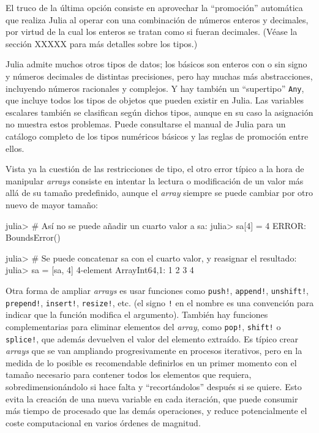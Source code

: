 ﻿\documentclass{article}
\newcommand{\code}{\texttt}
\begin{document}
El truco de la última opción consiste en aprovechar la ``promoción'' automática que realiza Julia al operar con una combinación de números enteros y decimales, por virtud de la cual los enteros se tratan como si fueran decimales. (Véase la sección XXXXX para más detalles sobre los tipos.)

Julia admite muchos otros tipos de datos; los básicos son enteros con o sin signo y números decimales de distintas precisiones, pero hay muchas más abstracciones, incluyendo números racionales y complejos. Y hay también un ``supertipo'' \code{Any}, que incluye todos los tipos de objetos que pueden existir en Julia. Las variables escalares también se clasifican según dichos tipos, aunque en su caso la asignación no muestra estos problemas. Puede consultarse el manual de Julia para un catálogo completo de los tipos numéricos básicos y las reglas de promoción entre ellos.

Vista ya la cuestión de las restricciones de tipo, el otro error típico a la hora de manipular \emph{arrays} consiste en intentar la lectura o modificación de un valor más allá de su tamaño predefinido, aunque el \emph{array} siempre se puede cambiar por otro nuevo de mayor tamaño:

julia> # Así no se puede añadir un cuarto valor a sa:
julia> sa[4] = 4
ERROR: BoundsError()

julia> # Se puede concatenar sa con el cuarto valor, y reasignar el resultado:
julia> sa = [sa, 4]
4-element Array{Int64,1}:
 1 
 2 
 3 
 4

Otra forma de ampliar \emph{arrays} es usar funciones como \code{push!}, \code{append!}, \code{unshift!}, \code{prepend!}, \code{insert!}, \code{resize!}, etc. (el signo \code{!} en el nombre es una convención para indicar que la función modifica el argumento). También hay funciones complementarias para eliminar elementos del \emph{array}, como \code{pop!}, \code{shift!} o \code{splice!}, que además devuelven el valor del elemento extraído. Es típico crear \emph{arrays} que se van ampliando progresivamente en procesos iterativos, pero en la medida de lo posible es recomendable definirlos en un primer momento con el tamaño necesario para contener todos los elementos que requiera, sobredimensionándolo si hace falta y ``recortándolos'' después si se quiere. Esto evita la creación de una nueva variable en cada iteración, que puede consumir más tiempo de procesado que las demás operaciones, y reduce potencialmente el coste computacional en varios órdenes de magnitud.
\end{document}
